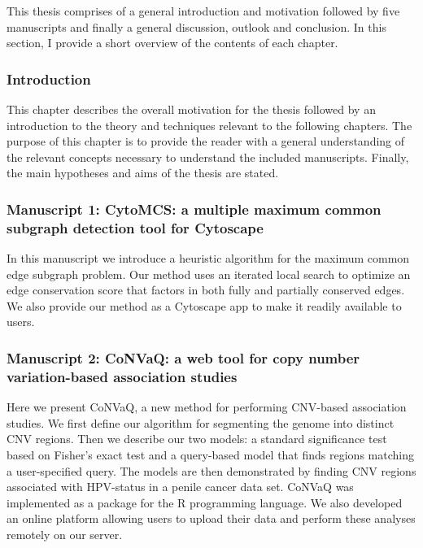 This thesis comprises of a general introduction and motivation followed by five manuscripts and finally a general discussion, outlook and conclusion.
In this section, I provide a short overview of the contents of each chapter.

\subsubsection*{Introduction} This chapter describes the overall motivation for the thesis followed by an introduction to the theory and techniques relevant to the following chapters. The purpose of this chapter is to provide the reader with a general understanding of the relevant concepts necessary to understand the included manuscripts. Finally, the main hypotheses and aims of the thesis are stated.

\subsubsection*{Manuscript 1: CytoMCS: a multiple maximum common subgraph detection tool for Cytoscape}
In this manuscript we introduce a heuristic algorithm for the maximum common edge subgraph problem. Our method uses an iterated local search to optimize an edge conservation score that factors in both fully and partially conserved edges. We also provide our method as a Cytoscape app to make it readily available to users.

\subsubsection*{Manuscript 2: CoNVaQ: a web tool for copy number variation-based association studies}
Here we present CoNVaQ, a new method for performing CNV-based association studies. We first define our algorithm for segmenting the genome into distinct CNV regions. Then we describe our two models: a standard significance test based on Fisher's exact test and a query-based model that finds regions matching a user-specified query. The models are then demonstrated by finding CNV regions associated with HPV-status in a penile cancer data set.
CoNVaQ was implemented as a package for the R programming language. We also developed an online platform allowing users to upload their data and perform these analyses remotely on our server.

